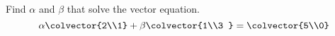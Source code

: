 Find $\alpha$ and $\beta$ that solve the vector equation.
%
\begin{equation*}
\alpha\colvector{2\\1}+
\beta\colvector{1\\3
}=
\colvector{5\\0}
\end{equation*}
%